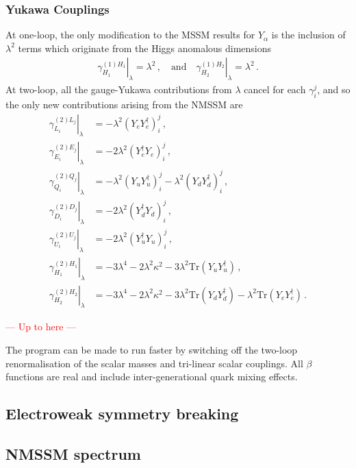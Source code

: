 \documentclass[final,3p,times,pdflatex]{elsarticle}
\newcommand{\lamsq}{\lambda^2}
\newcommand{\kapsq}{\kappa^2}
\newcommand{\tr}{\mathrm{Tr}}
\begin{document}
\subsubsection{Yukawa Couplings}
At one-loop, the only modification to the MSSM results \cite{MV94,Yam94} for 
$Y_\alpha$ is the inclusion of $\lamsq$ terms which originate from the Higgs 
anomalous dimensions
%
\begin{align}
\left.\gamma^{(1) H_1}_{H_1}\right|_\lambda = \lamsq\,, 
\quad \mbox{and} \quad \left.\gamma^{(1) H_2}_{H_2} \right|_\lambda = \lamsq\,.
\end{align}
%
At two-loop, all the gauge-Yukawa contributions from $\lambda$ cancel for each 
$\gamma_i^j$, and so the only new contributions arising from the NMSSM are
%
\begin{align}
\left.\gamma_{L_i}^{(2)L_j}\right|_\lambda &= -\lamsq (Y_e Y_e^\dagger)_i^j\,, \\
%
\left.\gamma_{E_i}^{(2)E_j}\right|_\lambda &= -2\lamsq (Y_e^\dagger Y_e)_i^j\,, \\
%
\left.\gamma_{Q_i}^{(2)Q_j}\right|_\lambda &= -\lamsq (Y_u Y_u^\dagger)_i^j 
- \lamsq (Y_d Y_d^\dagger)_i^j\,, \\
%
\left.\gamma_{D_i}^{(2)D_j}\right|_\lambda &= -2\lamsq (Y_d^\dagger Y_d)_i^j\,, \\
%
\left.\gamma_{U_i}^{(2)U_j}\right|_\lambda &= -2\lamsq (Y_u^\dagger Y_u)_i^j \,, \\
%
\left.\gamma_{H_1}^{(2)H_1}\right|_\lambda &= -3\lambda^4 -2\lamsq\kapsq 
- 3\lamsq \tr(Y_u Y_u^\dagger)\,, \\
%
\left.\gamma_{H_2}^{(2)H_2}\right|_\lambda &= -3\lambda^4 -2\lamsq\kapsq 
- 3\lamsq \tr(Y_d Y_d^\dagger) - \lamsq \tr(Y_e Y_e^\dagger)\,.
\end{align}
%

\textcolor{red}{--- Up to here ---}

The program 
can be made to run faster by switching off the two-loop renormalisation of 
the scalar masses and tri-linear scalar couplings. All
$\beta$ functions are real and include inter-generational quark mixing
effects. 

\subsection{Electroweak symmetry breaking \label{ewsb}}


\subsection{NMSSM spectrum \label{spec}}
\end{document}
